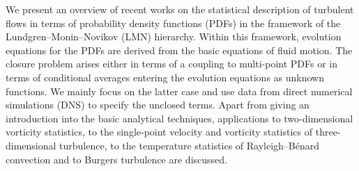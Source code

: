 We present an overview of recent works on the statistical description of turbulent flows in terms of probability density functions (PDFs) in the framework of the Lundgren–Monin–Novikov (LMN) hierarchy.
Within this framework, evolution equations for the PDFs are derived from the basic equations of fluid motion.
The closure problem arises either in terms of a coupling to multi-point PDFs or in terms of conditional averages entering the evolution equations as unknown functions.
We mainly focus on the latter case and use data from direct numerical simulations (DNS) to specify the unclosed terms.
Apart from giving an introduction into the basic analytical techniques, applications to two-dimensional vorticity statistics, to the single-point velocity and vorticity statistics of three-dimensional turbulence, to the temperature statistics of Rayleigh–Bénard convection and to Burgers turbulence are discussed.

